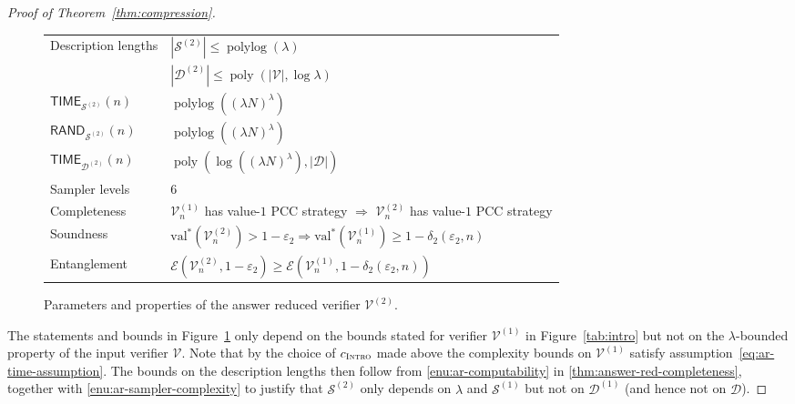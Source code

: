 \documentclass[11pt]{article}
\theoremstyle{definition}
\DeclareMathOperator{\poly}{poly}
\newcommand{\val}{\ensuremath{\mathrm{val}}}
\newcommand{\eps}{\varepsilon}
\DeclareMathOperator{\polylog}{polylog}
\newcommand{\abs}[1]{\left\vert {#1} \right\vert}
\newcommand{\sampler}{\mathcal{S}}
\newcommand{\decider}{\mathcal{D}}
\newcommand{\verifier}{\mathcal{V}}
\newcommand{\gamestyle}[1]{\ensuremath{\textsc{#1}}\xspace}
\newcommand{\intro}{\gamestyle{Intro}}
\newcommand{\Ent}{\mathscr{E}}
\newcommand{\TIME}{\mathsf{TIME}}
\newcommand{\RAND}{\mathsf{RAND}}
\begin{document}
\begin{proof}[Proof of Theorem~\ref{thm:compression}]
  \begin{figure}[H]
    \begin{center}
      \renewcommand{\arraystretch}{1.2}
      \begin{tabularx}{0.9\textwidth}{l X}
        \toprule \multirow{2}{*}{Description lengths}
        & $|\sampler^{(2)}| \leq \polylog(\lambda)$ \\
        & $|\decider^{(2)}| \leq \poly(\abs{\verifier}, \log \lambda)$ \\
        $\TIME_{\sampler^{(2)}}(n)$
        & $\polylog \left ((\lambda N)^\lambda \right)$ \\
        $\RAND_{\sampler^{(2)}}(n)$
        & $\polylog \left ( (\lambda N)^\lambda \right)$  \\
        $\TIME_{\decider^{(2)}}(n)$ & $\poly \left (\log \left ((\lambda
            N)^\lambda \right),
          |\decider| \right)$  \\
        Sampler levels &  $6$   \\
        Completeness & $\verifier_n^{(1)}$ has value-$1$ PCC strategy
        $\Rightarrow$
        $\verifier^{(2)}_n$ has value-$1$ PCC strategy \\
        Soundness & $\val^*(\verifier^{(2)}_n) > 1 - \eps_2 \Rightarrow
        \val^*(\verifier_n^{(1)}) \geq 1 - \delta_2(\eps_2,n)$ \\
        Entanglement & $\Ent(\verifier_n^{(2)},1 - \eps_2) \geq
        \Ent(\verifier_n^{(1)},1 - \delta_2(\eps_2,n))$ \\
        \bottomrule
      \end{tabularx}
      \caption{Parameters and properties of the answer reduced verifier
        $\verifier^{(2)}$.}
      \label{tab:ar}
    \end{center}
  \end{figure}
  The statements and bounds in Figure~\ref{tab:ar} only depend on the bounds
  stated for verifier $\verifier^{(1)}$ in Figure~\ref{tab:intro} but not on the
  $\lambda$-bounded property of the input verifier $\verifier$.
  Note that by the choice of $c_\intro$ made above the complexity bounds on
  $\verifier^{(1)}$ satisfy assumption~\eqref{eq:ar-time-assumption}.
  The bounds on the description lengths then follow from
  \cref{enu:ar-computability} in \cref{thm:answer-red-completeness}, together
  with \cref{enu:ar-sampler-complexity} to justify that $\sampler^{(2)}$ only
  depends on $\lambda$ and $\sampler^{(1)}$ but not on $\decider^{(1)}$ (and
  hence not on $\decider$).
	

\end{proof}
\end{document}
